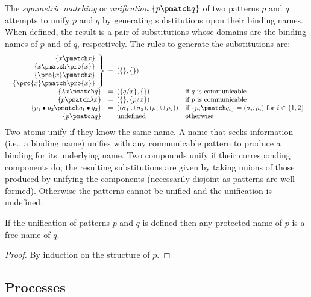 \documentclass{LMCS}
\begin{document}
The {\em symmetric matching} or {\em unification} $\{p \pmatch q\}$ of
two patterns $p$ and $q$ attempts to unify $p$ and $q$ by generating
substitutions upon their binding names. When defined, the result is
a pair of substitutions whose domains are the binding names of $p$
and of $q$, respectively. The rules to generate the substitutions are:
\begin{eqnarray*}
\begin{array}{rcll}
\left.
\begin{array}{r}
\{x\pmatch x\}\\
\{x\pmatch \pro{x}\}\\
\{\pro{x}\pmatch x\}\\
\{\pro{x}\pmatch \pro{x}\}
\end{array}
\right\}\!\!\! &=\!\!\!&  (\{\}, \{\})\\
\{\lambda x\pmatch q\} &=\!\!\!&  (\{q/x\}, \{\}) & \mbox{if $q$ is communicable}\\
\{p\pmatch \lambda x\} &=\!\!\!&  (\{\}, \{p/x\}) & \mbox{if $p$ is communicable}\\
\{p_1\bullet p_2\pmatch q_1\bullet q_2\} &=\!\!\!&  ((\sigma_1\cup\sigma_2), (\rho_1\cup\rho_2))
			& \mbox{if } \{p_i\pmatch q_i\}= (\sigma_i, \rho_i) \mbox{ for } i \in \{1,2\}\\
\{p\pmatch q\} &=\!\!\!& \mbox{undefined} & \mbox{otherwise}
\end{array}
\end{eqnarray*}
Two atoms unify if they know the same name. A name that seeks
information (i.e., a binding name) unifies with any communicable pattern to
produce a binding for its underlying name.  Two compounds unify if
their corresponding components do; the resulting substitutions are
given by taking unions of those produced by unifying the components 
(necessarily disjoint as patterns are well-formed).  Otherwise the
patterns cannot be unified and the unification is undefined.

\begin{prop}
\label{prop:free_n_match}
If the unification of patterns $p$ and $q$ is defined then any protected
name of $p$ is a free name of $q$.
\end{prop}
\begin{proof}
By induction on the structure of $p$. 
\end{proof}



\subsection{Processes}
\label{subsec:processes}
\end{document}

